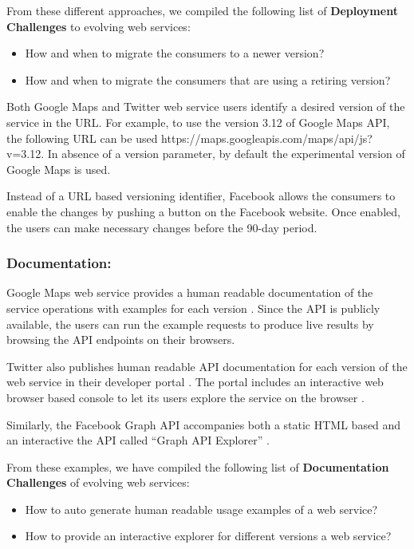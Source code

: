 \documentclass[runningheads,a4paper]{llncs}
\begin{document}
From these different approaches, we compiled the following list of \textbf{Deployment Challenges} to evolving web services:

\begin{itemize}
  \item How and when to migrate the consumers to a newer version?
  \item How and when to migrate the consumers that are using a retiring version?
\end{itemize}

Both Google Maps and Twitter web service users identify a desired version of the service in the URL. For example, to use the version 3.12 of Google Maps API, the following URL can be used https://maps.googleapis.com/maps/api/js?v=3.12. In absence of a version parameter, by default the experimental version of Google Maps is used.

Instead of a URL based versioning identifier, Facebook allows the consumers to enable the changes by pushing a button on the Facebook website. Once enabled, the users can make necessary changes before the 90-day period.

\subsubsection{Documentation:}
Google Maps web service provides a human readable documentation of the service operations with examples for each version \cite{google_maps_services}. Since the API is publicly available, the users can run the example requests to produce live results by browsing the API endpoints on their browsers.

Twitter also publishes human readable API documentation for each version of the web service in their developer portal \cite{twitter_api}. The portal includes an interactive web browser based console to let its users explore the service on the browser \cite{twitter_console}.

Similarly, the Facebook Graph API accompanies both a static HTML based and an interactive the API called ``Graph API Explorer'' \cite{facebook_api}.

From these examples, we have compiled the following list of \textbf{Documentation Challenges} of evolving web services:

\begin{itemize}
  \item How to auto generate human readable usage examples of a web service?
  \item How to provide an interactive explorer for different versions a web service?
\end{itemize}
\end{document}
